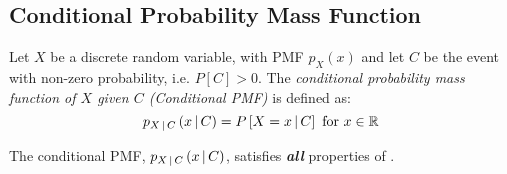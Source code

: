 	\subsection{Conditional Probability Mass Function} \label{subsec:Conditional Probability Mass Function}
		\begin{definition} \label{def:Conditional Probability Mass Function}
			Let $X$ be a discrete random variable, with PMF $p_{X} \left( x \right)$ and let $C$ be the event with non-zero probability, i.e. $P \left[ C \right] > 0$.
			The \emph{conditional probability mass function of $X$ given $C$ (Conditional PMF)} is defined as:
			\begin{equation} \label{eq:Conditional Probability Mass Function}
				p_{X \operatorname{\vert} C} \left( x \operatorname{\vert} C \right) = P \left[ X=x \operatorname{\vert} C \right] \text{ for } x \in \operatorname{\mathbb{R}}
			\end{equation}
			\begin{remark} \label{rmk:Properties of Conditional Probability Mass Functions}
				The conditional PMF, $p_{X \operatorname{\vert} C} \left( x \operatorname{\vert} C \right)$, satisfies \emph{\textbf{all}} properties of .
			\end{remark}
		\end{definition}
	
